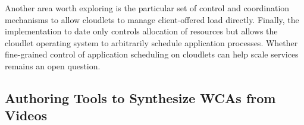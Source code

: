 Another area worth exploring is the particular set of control and coordination
mechanisms to allow cloudlets to manage client-offered load directly. Finally,
the implementation to date only controls allocation of resources but allows the
cloudlet operating system to arbitrarily schedule application processes. Whether
fine-grained control of application scheduling on cloudlets can help scale
services remains an open question.


\subsection{Authoring Tools to Synthesize WCAs from Videos}